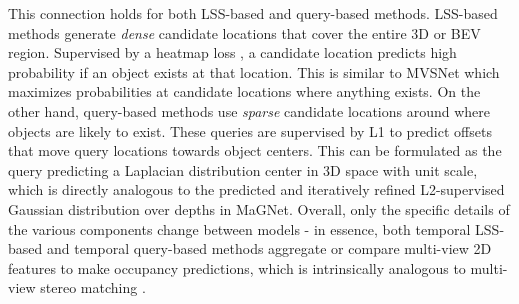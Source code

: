 \documentclass[runningheads, hyperfootnotes=false]{article}
\begin{document}
This connection holds for both LSS-based and query-based methods. LSS-based methods generate \textit{dense} candidate locations that cover the entire 3D or BEV region. Supervised by a heatmap loss \cite{Yin2021Centerbased3O}, a candidate location predicts high probability if an object exists at that location. This is similar to MVSNet which maximizes probabilities at candidate locations where anything exists. On the other hand, query-based methods use \textit{sparse} candidate locations around where objects are likely to exist. These queries are supervised by L1 to predict offsets that move query locations towards object centers. This can be formulated as the query predicting a Laplacian distribution center in 3D space with unit scale, which is directly analogous to the predicted and iteratively refined L2-supervised Gaussian distribution over depths in MaGNet. Overall, only the specific details of the various components change between models - in essence, both temporal LSS-based and temporal query-based methods aggregate or compare multi-view 2D features to make occupancy predictions, which is intrinsically analogous to multi-view stereo matching \citep{yang2020cost}.
\end{document}
